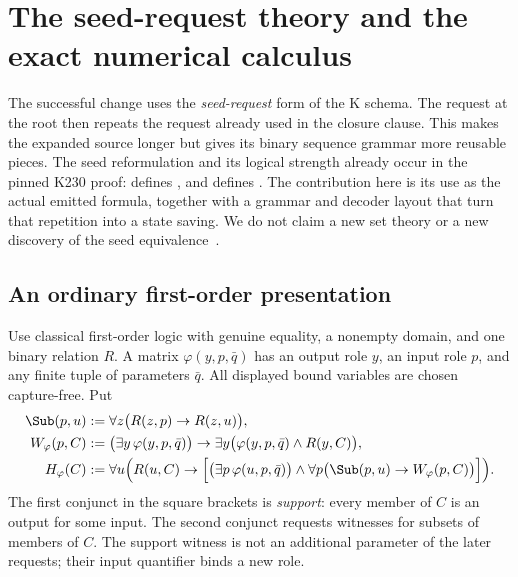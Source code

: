 \section{The seed-request theory and the exact numerical calculus}
\label{sec:seed-theory}

The successful change uses the \emph{seed-request} form of the K schema.
The request at the root then repeats the request already used in the
closure clause.  This makes the expanded source longer but gives its
binary sequence grammar more reusable pieces.  The seed reformulation
and its logical strength already occur in the pinned K230 proof:
 defines , and  defines
.  The contribution here is its use as the actual
emitted formula, together with a grammar and decoder layout that turn
that repetition into a state saving.  We do not claim a new set theory
or a new discovery of the seed equivalence~\cite{kpseed,kprimecore}.

\subsection{An ordinary first-order presentation}

Use classical first-order logic with genuine equality, a nonempty domain,
and one binary relation $R$.  A matrix $\varphi(y,p,\bar q)$ has an output
role $y$, an input role $p$, and any finite tuple of parameters $\bar q$.
All displayed bound variables are chosen capture-free.  Put
\begin{align}
 \Sub(p,u)&:=\forall z\bigl(R(z,p)\to R(z,u)\bigr),
 \label{eq:ks-sub}\\
 W_\varphi(p,C)&:=
   \bigl(\exists y\,\varphi(y,p,\bar q)\bigr)
   \to\exists y\bigl(\varphi(y,p,\bar q)\land R(y,C)\bigr),
 \label{eq:ks-request}\\
 H_\varphi(C)&:=\forall u\Bigl(R(u,C)\to
   \Bigl[\bigl(\exists p\,\varphi(u,p,\bar q)\bigr)
   \land\forall p\bigl(\Sub(p,u)\to W_\varphi(p,C)\bigr)\Bigr]\Bigr).
 \label{eq:ks-closure}
\end{align}
The first conjunct in the square brackets is \emph{support}: every member
of $C$ is an output for some input.  The second conjunct requests witnesses
for subsets of members of $C$.  The support witness is not an additional
parameter of the later requests; their input quantifier binds a new role.

